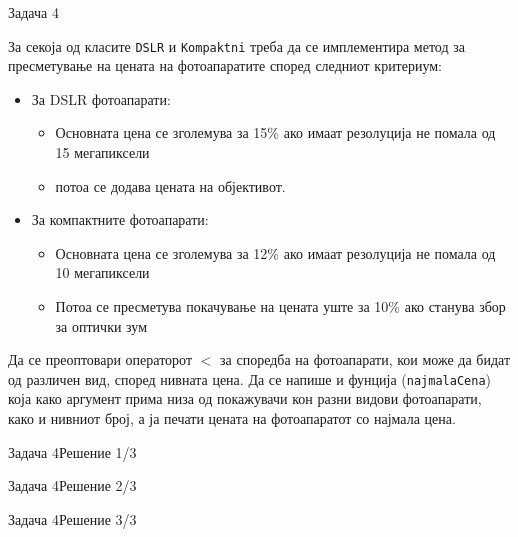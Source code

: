 \begin{frame}{Задача 4}
\begin{scriptsize}
За секоја од класите \texttt{DSLR} и \texttt{Kompaktni} треба да се имплементира
метод за пресметување на цената на фотоапаратите според следниот критериум: 
\begin{itemize}
  \item За DSLR фотоапарати:
  \begin{itemize}
  \item Основната цена се зголемува за 15\% ако имаат резолуција не помала од 15
  мегапиксели
  \item потоа се додава цената на објективот.
  \end{itemize}
  \item За компактните фотоапарати: 
  \begin{itemize}
    \item Основната цена се зголемува за 12\% ако имаат резолуција не помала од
    10 мегапиксели
    \item Потоа се пресметува покачување на цената уште за 10\% ако станува збор
    за оптички зум
  \end{itemize}  
\end{itemize}
Да се преоптовари операторот $<$ за споредба на фотоапарати, кои може да бидат
од различен вид, според нивната цена.
Да се напише и фунција (\texttt{najmalaCena}) која како аргумент прима низа од
покажувачи кон разни видови фотоапарати, како и нивниот број, а ја печати цената
на фотоапаратот со најмала цена.
\end{scriptsize}
\end{frame}

\begin{frame}[fragile]{Задача 4}{Решение 1/3}

\end{frame}

\begin{frame}[fragile]{Задача 4}{Решение 2/3}

\end{frame}

\begin{frame}[fragile]{Задача 4}{Решение 3/3}

\end{frame}

